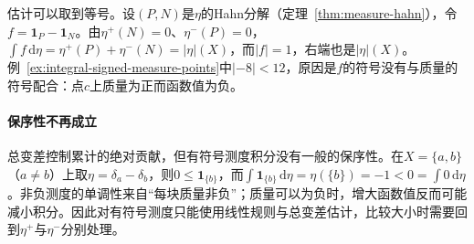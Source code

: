 估计可以取到等号。设$(P,N)$是$\eta$的Hahn分解（定理~\ref{thm:measure-hahn}），令$f=\mathbf 1_P-\mathbf 1_N$。由$\eta^+(N)=0$、$\eta^-(P)=0$，$\int f\,\mathrm d\eta=\eta^+(P)+\eta^-(N)=|\eta|(X)$，而$|f|=1$，右端也是$|\eta|(X)$。例~\ref{ex:integral-signed-measure-points}中$|-8|<12$，原因是$f$的符号没有与质量的符号配合：点$c$上质量为正而函数值为负。

\paragraph{保序性不再成立}
总变差控制累计的绝对贡献，但有符号测度积分没有一般的保序性。在$X=\{a,b\}$（$a\ne b$）上取$\eta=\delta_a-\delta_b$，则$0\le\mathbf 1_{\{b\}}$，而$\int\mathbf 1_{\{b\}}\,\mathrm d\eta=\eta(\{b\})=-1<0=\int0\,\mathrm d\eta$。非负测度的单调性来自“每块质量非负”；质量可以为负时，增大函数值反而可能减小积分。因此对有符号测度只能使用线性规则与总变差估计，比较大小时需要回到$\eta^+$与$\eta^-$分别处理。
